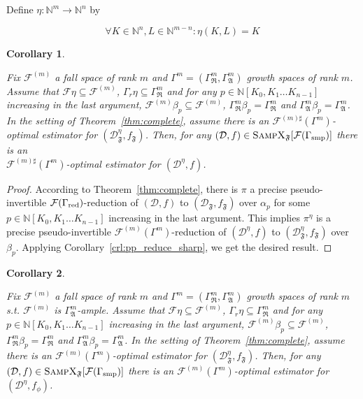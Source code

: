 \documentclass[11pt]{article}
\numberwithin{equation}{section}
\theoremstyle{definition}
\theoremstyle{plain}
\newtheorem{corollary}{Corollary}[section]
\newcommand{\Nats}{\mathbb{N}}
\newcommand{\NatPoly}{\Nats[K_0, K_1 \ldots K_{n-1}]}
\newcommand{\Dist}{\mathcal{D}}
\newcommand{\GrowR}{\Gamma_{\mathfrak{R}}}
\newcommand{\GrowA}{\Gamma_{\mathfrak{A}}}
\newcommand{\Fall}{\mathcal{F}}
\begin{document}
Define ${\eta: \Nats^{m} \rightarrow \Nats^n}$ by

\begin{equation}
\forall K \in \Nats^n, L \in \Nats^{m-n}: \eta(K,L)=K
\end{equation}


\begin{samepage}
\begin{corollary}
\label{crl:complete_sharp}

Fix ${\Fall^{(m)}}$ a fall space of rank ${m}$ and ${\Gamma^m=(\GrowR^m, \GrowA^m)}$ growth spaces of rank ${m}$. Assume that ${\Fall \eta \subseteq \Fall^{(m)}}$, ${\Gamma_r \eta \subseteq \GrowR^{m}}$ and for any ${p \in \NatPoly}$ increasing in the last argument, ${\Fall^{(m)} \beta_p \subseteq \Fall^{(m)}}$, ${\GrowR^m \beta_p = \GrowR^m}$ and ${\GrowA^m \beta_p = \GrowA^m}$. In the setting of Theorem~\ref{thm:complete}, assume there is an ${\Fall^{(m)\sharp}(\Gamma^m)}$-optimal estimator for ${(\Dist_{\mathfrak{F}}^\eta,f_{\mathfrak{F}})}$. Then, for any ${(\Dist,f) \in \textsc{SampX}_\mathfrak{F}[\Fall(\Gamma_{\text{smp}})]}$ there is an\\ $\Fall^{(m)\sharp}(\Gamma^m)$-optimal estimator for ${(\Dist^\eta,f)}$.

\end{corollary}
\end{samepage}

\begin{proof}

According to Theorem~\ref{thm:complete}, there is ${\pi}$ a precise pseudo-invertible ${\Fall(\Gamma_{\textnormal{red}})}$-reduction of ${(\Dist,f)}$ to ${(\Dist_{\mathfrak{F}},f_{\mathfrak{F}})}$ over ${\alpha_p}$ for some ${p \in \NatPoly}$  increasing in the last argument. This implies ${\pi^\eta}$ is a precise pseudo-invertible ${\Fall^{(m)}(\Gamma^m)}$-reduction of ${(\Dist^\eta,f)}$ to ${(\Dist_{\mathfrak{F}}^\eta,f_{\mathfrak{F}})}$ over ${\beta_p}$. Applying Corollary~\ref{crl:pp_reduce_sharp}, we get the desired result. 
%
\end{proof}

\begin{samepage}
\begin{corollary}
\label{crl:complete}

Fix ${\Fall^{(m)}}$ a fall space of rank ${m}$ and ${\Gamma^m=(\GrowR^m, \GrowA^m)}$ growth spaces of rank ${m}$ s.t. ${\Fall^{(m)}}$ is ${\GrowA^m}$-ample. Assume that ${\Fall \eta \subseteq \Fall^{(m)}}$, ${\Gamma_r \eta \subseteq \GrowR^{m}}$ and for any ${p \in \NatPoly}$ increasing in the last argument, ${\Fall^{(m)} \beta_p \subseteq \Fall^{(m)}}$, ${\GrowR^m \beta_p = \GrowR^m}$ and ${\GrowA^m \beta_p = \GrowA^m}$. In the setting of Theorem~\ref{thm:complete}, assume there is an ${\Fall^{(m)}(\Gamma^m)}$-optimal estimator for ${(\Dist_{\mathfrak{F}}^\eta,f_{\mathfrak{F}})}$. Then, for any ${(\Dist,f) \in \textsc{SampX}_\mathfrak{F}[\Fall(\Gamma_{\text{smp}})]}$ there is an ${\Fall^{(m)}(\Gamma^m)}$-optimal estimator for ${(\Dist^\eta,f_\phi)}$.
\end{corollary}
\end{samepage}
\end{document}
